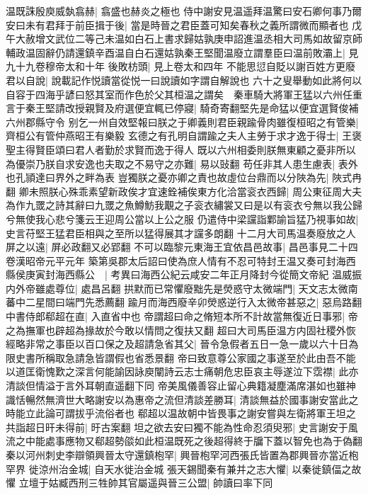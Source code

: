 温既誅殷庾威埶翕赫|{
	翕盛也赫炎之極也}
侍中謝安見温遥拜温驚曰安石卿何事乃爾安曰未有君拜于前臣揖于後|{
	當是時晉之君臣蓋可知矣春秋之義所謂微而顯者也}
戊午大赦增文武位二等己未温如白石上書求歸姑孰庚申詔進温丞相大司馬如故留京師輔政温固辭仍請還鎮辛酉温自白石還姑孰秦王堅聞温廢立謂羣臣曰温前敗灞上|{
	見九十九卷穆帝太和十年}
後敗枋頭|{
	見上卷太和四年}
不能思愆自貶以謝百姓方更廢君以自說|{
	說載記作悦讀當從悦一曰說讀如字謂自解說也}
六十之叟舉動如此將何以自容于四海乎諺曰怒其室而作色於父其桓温之謂矣　秦車騎大將軍王猛以六州任重言于秦王堅請改授親賢及府選便宜輒已停寢|{
	騎奇寄翻堅先是命猛以便宜選賢俊補六州郡縣守令}
别乞一州自效堅報曰朕之于卿義則君臣親踰骨肉雖復桓昭之有管樂|{
	齊桓公有管仲燕昭王有樂毅}
玄德之有孔明自謂踰之夫人主勞于求才逸于得士|{
	王褒聖主得賢臣頌曰君人者勤於求賢而逸于得人}
既以六州相委則朕無東顧之憂非所以為優崇乃朕自求安逸也夫取之不易守之亦難|{
	易以䜴翻}
苟任非其人患生慮表|{
	表外也孔頴達曰界外之畔為表}
豈獨朕之憂亦卿之責也故虛位台鼎而以分陜為先|{
	陜式冉翻}
卿未照朕心殊乖素望新政俟才宜速銓補俟東方化洽當衮衣西歸|{
	周公東征周大夫為作九罭之詩其辭曰九罭之魚鱒魴我覯之子衮衣繡裳又曰是以有衮衣兮無以我公歸兮無使我心悲兮箋云王迎周公當以上公之服}
仍遣侍中梁讜詣鄴諭旨猛乃視事如故|{
	史言苻堅王猛君臣相與之至所以猛得展其才讜多朗翻}
十二月大司馬温奏廢放之人屏之以遠|{
	屏必政翻又必郢翻}
不可以臨黎元東海王宜依昌邑故事|{
	昌邑事見二十四卷漢昭帝元平元年}
築第吳郡太后詔曰使為庶人情有不忍可特封王温又奏可封海西縣侯庚寅封海西縣公　|{
	考異曰海西公紀云咸安二年正月降封今從簡文帝紀}
温威振内外帝雖處尊位|{
	處昌呂翻}
拱默而已常懼廢黜先是熒惑守太微端門|{
	天文志太微南蕃中二星間曰端門先悉薦翻}
踰月而海西廢辛卯熒惑逆行入太微帝甚惡之|{
	惡烏路翻}
中書侍郎郗超在直|{
	入直省中也}
帝謂超曰命之脩短本所不計故當無復近日事邪|{
	帝之為撫軍也辟超為掾故於今敢以情問之復扶又翻}
超曰大司馬臣温方内固社稷外恢經略非常之事臣以百口保之及超請急省其父|{
	晉令急假者五日一急一歲以六十日為限史書所稱取急請急皆謂假也省悉景翻}
帝曰致意尊公家國之事遂至於此由吾不能以道匡衛愧歎之深言何能諭因詠庾闡詩云志士痛朝危忠臣哀主辱遂泣下霑襟|{
	此亦清談但情溢于言外耳朝直遥翻下同}
帝美風儀善容止留心典籍凝塵滿席湛如也雖神識恬暢然無濟世大略謝安以為惠帝之流但清談差勝耳|{
	清談無益於國事謝安當此之時能立此論可謂拔乎流俗者也}
郗超以温故朝中皆畏事之謝安嘗與左衛將軍王坦之共詣超日旰未得前|{
	旴古案翻}
坦之欲去安曰獨不能為性命忍須臾邪|{
	史言謝安于風流之中能處事應物又郗超勢燄如此桓温既死之後超得終于牖下蓋以智免也為于偽翻}
秦以河州刺史李辯領興晉太守還鎮枹罕|{
	興晉枹罕河西張氏皆置為郡興晉亦當近枹罕界}
徙涼州治金城|{
	自天水徙治金城}
張天錫聞秦有兼并之志大懼|{
	以秦徙鎮偪之故懼}
立壇于姑臧西刑三牲帥其官屬遥與晉三公盟|{
	帥讀曰率下同}
